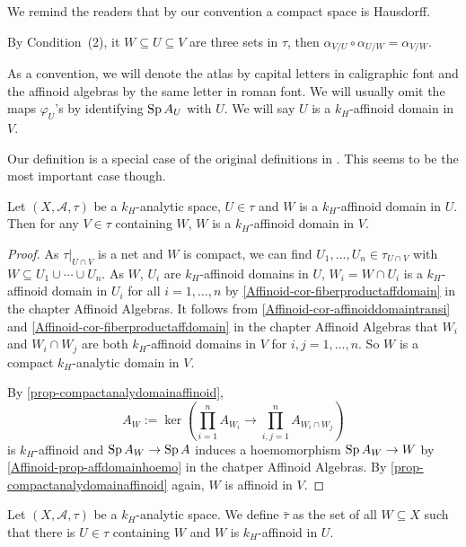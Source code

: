 We remind the readers that by our convention a compact space is Hausdorff. 

By Condition~(2), it $W\subseteq U\subseteq V$ are three sets in $\tau$, then $\alpha_{V/U}\circ\alpha_{U/W}=\alpha_{V/W}$.

\begin{remark}\label{rmk-affdomainident}
    As a convention, we will denote the atlas by capital  letters in caligraphic font and the affinoid algebras by the same letter in roman font. We will usually omit the maps $\varphi_U$'s by identifying $\operatorname{Sp} A_U$ with $U$. We will say $U$ is a $k_H$-affinoid domain in $V$.    
\end{remark}


\begin{remark}
    Our definition is a special case of the original definitions in \cite{Berk93}. This seems to be the most important case though.
\end{remark}

\begin{lemma}\label{lma-innetaffinoneaffinall}
    Let $(X,\mathcal{A},\tau)$ be a $k_H$-analytic space, $U\in \tau$ and $W$ is a $k_H$-affinoid domain in $U$. Then for any $V\in \tau$ containing $W$, $W$ is a $k_H$-affinoid domain in $V$.
\end{lemma}
\begin{proof}
    As $\tau|_{U\cap V}$ is a net and $W$ is compact, we can find $U_1,\ldots,U_n\in \tau_{U\cap V}$ with $W\subseteq U_1\cup \cdots\cup  U_n$. As $W$, $U_i$ are $k_H$-affinoid domains in $U$, $W_i=W\cap U_i$ is a $k_H$-affinoid domain in $U_i$ for all $i=1,\ldots,n$ by \cref{Affinoid-cor-fiberproductaffdomain} in the chapter Affinoid Algebras. It follows from \cref{Affinoid-cor-affinoiddomaintransi} and \cref{Affinoid-cor-fiberproductaffdomain} in the chapter Affinoid Algebras that $W_i$ and $W_i\cap W_j$ are both $k_H$-affinoid domains in $V$ for $i,j=1,\ldots,n$. So $W$ is a compact $k_H$-analytic domain in $V$.

    By \cref{prop-compactanalydomainaffinoid},
    \[
        A_W:=\ker  \left( \prod_{i=1}^n A_{W_i} \rightarrow \prod_{i,j=1}^n A_{W_i\cap W_j}\right)
    \]
    is $k_H$-affinoid and $\operatorname{Sp} A_W\rightarrow \operatorname{Sp} A$ induces a hoemomorphism $\operatorname{Sp} A_W\rightarrow W$ by \cref{Affinoid-prop-affdomainhoemo} in the chatper Affinoid Algebras. By \cref{prop-compactanalydomainaffinoid} again, $W$ is affinoid in $V$. 
\end{proof}

\begin{definition}
    Let $(X,\mathcal{A},\tau)$ be a $k_H$-analytic space. We define $\bar{\tau}$ as the set of all $W\subseteq X$ such that there is $U\in \tau$ containing $W$ and $W$ is $k_H$-affinoid in $U$.
\end{definition}

